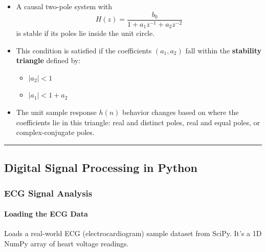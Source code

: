 \begin{itemize}
  \begin{itemize}
  \tightlist
  \item
    A causal two-pole system with
    \[H(z) = \frac{b_0}{1 + a_1 z^{-1} + a_2 z^{-2}}\] is stable if its
    poles lie inside the unit circle.
  \item
    This condition is satisfied if the coefficients \((a_1, a_2)\) fall
    within the \textbf{stability triangle} defined by:

    \begin{itemize}
    \tightlist
    \item
      \(|a_2| < 1\)
    \item
      \(|a_1| < 1 + a_2\)
    \end{itemize}
  \item
    The unit sample response \(h(n)\) behavior changes based on where
    the coefficients lie in this triangle: real and distinct poles, real
    and equal poles, or complex-conjugate poles.
  \end{itemize}
\end{itemize}

\begin{center}\rule{0.5\linewidth}{0.5pt}\end{center}

\subsection{Digital Signal Processing in
Python}\label{digital-signal-processing-in-python}

\subsubsection{ECG Signal Analysis}\label{ecg-signal-analysis}

\paragraph{Loading the ECG Data}\label{loading-the-ecg-data}

\begin{Shaded}
\begin{Highlighting}[]
\OperatorTok{=}
\end{Highlighting}
\end{Shaded}

Loads a real-world ECG (electrocardiogram) sample dataset from SciPy.
It's a 1D NumPy array of heart voltage readings.


